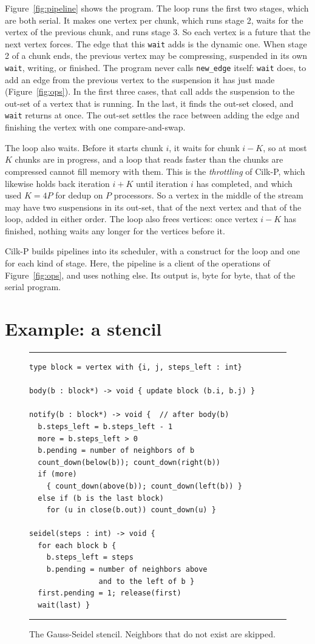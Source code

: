 \documentclass[sigplan,nonacm]{acmart}
\begin{document}
Figure~\ref{fig:pipeline} shows the program.
%
The loop runs the first two stages, which are both serial.
%
It makes one vertex per chunk, which runs stage 2, waits for the
vertex of the previous chunk, and runs stage 3.
%
So each vertex is a future that the next vertex forces.
%
The edge that this \lstinline|wait| adds is the dynamic one.
%
When stage 2 of a chunk ends, the previous vertex may be compressing,
suspended in its own \lstinline|wait|, writing, or finished.
%
The program never calls \lstinline|new_edge| itself:
\lstinline|wait| does, to add an edge from the previous vertex to the
suspension it has just made (Figure~\ref{fig:ops}).
%
In the first three cases, that call adds the suspension to the out-set
of a vertex that is running.
%
In the last, it finds the out-set closed, and \lstinline|wait|
returns at once.
%
The out-set settles the race between adding the edge and finishing the
vertex with one compare-and-swap.

The loop also waits.
%
Before it starts chunk $i$, it waits for chunk $i-K$, so at most $K$
chunks are in progress, and a loop that reads faster than the chunks
are compressed cannot fill memory with them.
%
This is the \emph{throttling} of Cilk-P, which likewise holds back
iteration $i+K$ until iteration $i$ has completed, and which used
$K = 4P$ for dedup on $P$ processors.
%
So a vertex in the middle of the stream may have two suspensions in its
out-set, that of the next vertex and that of the loop, added in either
order.
%
The loop also frees vertices: once vertex $i-K$ has finished, nothing
waits any longer for the vertices before it.

Cilk-P builds pipelines into its scheduler, with a construct for the
loop and one for each kind of stage.
%
Here, the pipeline is a client of the operations of
Figure~\ref{fig:ops}, and uses nothing else.
%
Its output is, byte for byte, that of the serial program.

\section{Example: a stencil}
\label{sec:stencil}

\begin{figure}
\hrule
\begin{lstlisting}
type block = vertex with {i, j, steps_left : int}

body(b : block*) -> void { update block (b.i, b.j) }

notify(b : block*) -> void {  // after body(b)
  b.steps_left = b.steps_left - 1
  more = b.steps_left > 0
  b.pending = number of neighbors of b
  count_down(below(b)); count_down(right(b))
  if (more)
    { count_down(above(b)); count_down(left(b)) }
  else if (b is the last block)
    for (u in close(b.out)) count_down(u) }

seidel(steps : int) -> void {
  for each block b {
    b.steps_left = steps
    b.pending = number of neighbors above
                and to the left of b }
  first.pending = 1; release(first)
  wait(last) }
\end{lstlisting}
\hrule
\caption{The Gauss-Seidel stencil.  Neighbors that do not exist are
  skipped.}
\label{fig:stencil}
\end{figure}
\end{document}
